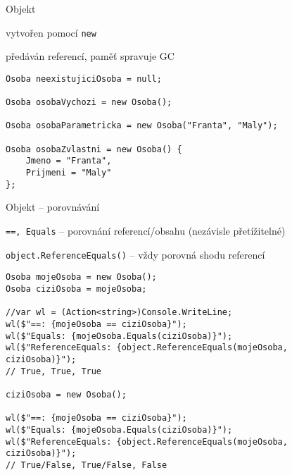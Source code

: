 



\begin{frame}[fragile]
\begin{bitemize}{Objekt}
\item vytvořen pomocí \lstinline|new|
\item předáván referencí, paměť spravuje GC
\end{bitemize}

\begin{yesblock}
\begin{lstlisting}
Osoba neexistujiciOsoba = null;

Osoba osobaVychozi = new Osoba();

Osoba osobaParametricka = new Osoba("Franta", "Maly");

Osoba osobaZvlastni = new Osoba() {
	Jmeno = "Franta",
	Prijmeni = "Maly"
};
\end{lstlisting}
\end{yesblock}
\end{frame}



\begin{frame}[fragile]
\begin{bitemize}{Objekt -- porovnávání}
\item \lstinline|==, Equals| -- porovnání referencí/obsahu (nezávisle přetížitelné)
\item \lstinline|object.ReferenceEquals()| -- vždy porovná shodu referencí
\end{bitemize}

\begin{yesblock}
\begin{lstlisting}[basicstyle=\small]
Osoba mojeOsoba = new Osoba();
Osoba ciziOsoba = mojeOsoba;

//var wl = (Action<string>)Console.WriteLine;
wl($"==: {mojeOsoba == ciziOsoba}");
wl($"Equals: {mojeOsoba.Equals(ciziOsoba)}");
wl($"ReferenceEquals: {object.ReferenceEquals(mojeOsoba, ciziOsoba)}");
// True, True, True

ciziOsoba = new Osoba();

wl($"==: {mojeOsoba == ciziOsoba}");
wl($"Equals: {mojeOsoba.Equals(ciziOsoba)}");
wl($"ReferenceEquals: {object.ReferenceEquals(mojeOsoba, ciziOsoba)}");
// True/False, True/False, False
\end{lstlisting}
\end{yesblock}
\end{frame}




